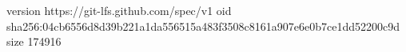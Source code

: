 version https://git-lfs.github.com/spec/v1
oid sha256:04cb6556d8d39b221a1da556515a483f3508c8161a907e6e0b7ce1dd52200c9d
size 174916
